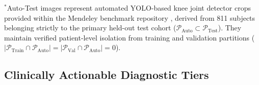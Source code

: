 \documentclass[10pt,journal]{IEEEtran}
\begin{document}
\begin{table}[t]
\centering
\caption{Patient-level dataset stratification and secondary evaluation subsets.}
\label{tab:data_split}
\scriptsize
\setlength{\tabcolsep}{3.5pt}
\renewcommand{\arraystretch}{1.15}
\vspace{2pt}
\parbox{\columnwidth}{\footnotesize $^*$Auto-Test images represent automated YOLO-based knee joint detector crops provided within the Mendeley benchmark repository \cite{chen2018dataset, chen2019fully}, derived from 811 subjects belonging strictly to the primary held-out test cohort ($\mathcal{P}_{\text{Auto}} \subset \mathcal{P}_{\text{Test}}$). They maintain verified patient-level isolation from training and validation partitions ($|\mathcal{P}_{\text{Train}} \cap \mathcal{P}_{\text{Auto}}| = |\mathcal{P}_{\text{Val}} \cap \mathcal{P}_{\text{Auto}}| = 0$).}
\end{table}

\subsection{Clinically Actionable Diagnostic Tiers}
\label{subsec:class_remapping}
\end{document}
